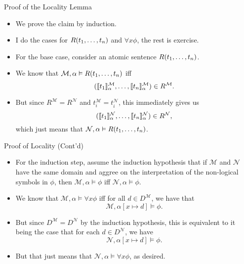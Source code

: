 \begin{frame}{Proof of the Locality Lemma}

  \begin{itemize}
  \item We prove the claim by induction.
    \item I do the cases for $R(t_1, \mathellipsis, t_n)$ and $\forall
      x\phi$, the rest is exercise.
      \item For the base case, consider an atomic sentence $R(t_1,
        \mathellipsis, t_n)$.
        \item We know that $\mathcal{M},\alpha\vDash
          R(t_1,\mathellipsis, t_n)$ iff \[(\llbracket
                  t_1\rrbracket_\alpha^\mathcal{M}, \mathellipsis,
                  \llbracket t_n\rrbracket_\alpha^\mathcal{M}) \in
                  R^\mathcal{M}.\]
                  \item But since $R^\mathcal{M}=R^\mathcal{N}$ and
                    $t_i^\mathcal{M}=t_i^\mathcal{N}$, this immediately
                    gives us \[(\llbracket
                  t_1\rrbracket_\alpha^\mathcal{N}, \mathellipsis,
                  \llbracket t_n\rrbracket_\alpha^\mathcal{N}) \in
                  R^\mathcal{N},\] which just means that
                $\mathcal{N},\alpha\vDash R(t_1, \mathellipsis, t_n)$.
  \end{itemize}
  
\end{frame}

\begin{frame}{Proof of Locality (Cont'd)}

  \begin{itemize}
  \item For the induction step, assume the induction hypothesis that
    if $\mathcal{M}$ and 
    $\mathcal{N}$ have the same domain and aggree on the
    interpretation of the non-logical 
    symbols in $\phi$, then $\mathcal{M},\alpha\vDash \phi$ iff
    $\mathcal{N},\alpha\vDash\phi$.

  \item We know that $\mathcal{M},\alpha\vDash\forall x\phi$ iff for
    all $d\in D^\mathcal{M}$, we have that
    \[\mathcal{M},\alpha[x\mapsto d]\vDash\phi.\]

    \item But since $D^\mathcal{M}=D^\mathcal{N}$ by the induction
      hypothesis, this is equivalent to it being the case that  for each $d\in D^\mathcal{N}$, we
      have  \[\mathcal{N},\alpha[x\mapsto d]\vDash\phi.\]

      \item But that just means that $\mathcal{N},\alpha\vDash \forall
        x\phi$, as desired.
    
  \end{itemize}
  
\end{frame}

